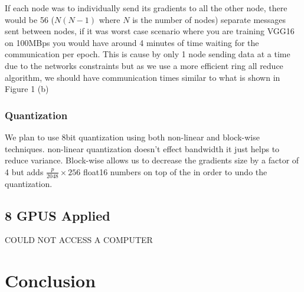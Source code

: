 \documentclass[11pt]{article}
\begin{document}
If each node was to individually send its gradients to all the other node, there would be 56 ($N(N-1)$ where $N$ is the number of nodes) separate messages sent between nodes, if it was worst case scenario where you are training VGG16 on 100MBps you would have around 4 minutes of time waiting for the communication per epoch. This is cause by only 1 node sending data at a time due to the networks constraints but as we use a more efficient ring all reduce algorithm, we should have communication times similar to what is shown in Figure 1 (b)

\subsubsection{Quantization}
We plan to use 8bit quantization using both non-linear and block-wise techniques. non-linear quantization doesn't effect bandwidth it just helps to reduce variance. Block-wise allows us to decrease the gradients size by a factor of 4 but adds $\frac{p}{2048}\times 256$ float16 numbers on top of the in order to undo the quantization.



\subsection{8 GPUS Applied}
\begin{Huge}
\begin{center}
COULD NOT ACCESS A COMPUTER
\end{center}
\end{Huge}


\section{Conclusion}
 
\end{document}
